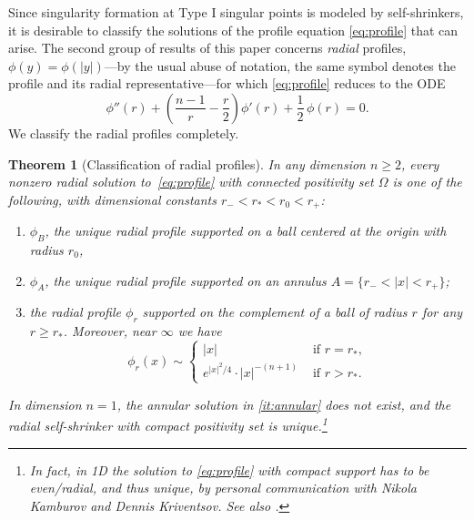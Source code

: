 \documentclass[11pt]{article}
\numberwithin{equation}{section}
\newtheorem{theorem}{Theorem}[section]
\theoremstyle{definition}
\begin{document}
\medskip

Since singularity formation at Type I singular points is modeled by self-shrinkers, it is desirable to classify the solutions of the profile equation \eqref{eq:profile} that can arise. The second group of results of this paper concerns \emph{radial} profiles, $\phi(y) = \phi(|y|)$---by the usual abuse of notation, the same symbol denotes the profile and its radial representative---for which \eqref{eq:profile} reduces to the ODE
\begin{equation}\label{eq:ode}
    \phi''(r) + \left(\frac{n-1}{r} - \frac{r}{2}\right) \phi'(r) + \frac{1}{2}\,\phi(r) = 0.\tag{RP}
\end{equation}
We classify the radial profiles completely. 

\begin{theorem}[Classification of radial profiles]\label{thm:radial}
    In any dimension $n\geq 2$, every nonzero radial solution to~\eqref{eq:profile} with connected positivity set $\Omega$ is one of the following, with dimensional constants $r_- < r_* < r_0 < r_+$:
    \begin{enumerate}[label=(\roman*), topsep=0pt]
        \item $\phi_B$, the unique radial profile supported on a ball centered at the origin with radius $r_0$,
        \item\label{it:annular} $\phi_A$, the unique radial profile supported on an annulus $A=\{r_-<|x|<r_+ \}$;
        \item the radial profile $\phi _r$ supported on the complement of a ball of radius $r$ for any $r \geq r_*$. 
        Moreover, near $\infty$ we have
        \[ \phi_r(x) \sim \left\{\begin{array}{ll}
            |x| & \text{ if } r = r_*, \\
            e ^{\left\lvert x \right\rvert^2/4} \cdot \left\lvert x \right\rvert ^{-(n+1)} & \text{ if } r > r_*. 
        \end{array} \right. \]
    \end{enumerate}
    In dimension $n=1$, the annular solution in \ref{it:annular} does not exist, and the radial self-shrinker with compact positivity set is unique.\footnote{In fact, in 1D the solution to \eqref{eq:profile} with compact support has to be even/radial, and thus unique, by personal communication with Nikola Kamburov and Dennis Kriventsov. See also \cite[Lemma 7.5]{radial}.}
\end{theorem}
\end{document}
